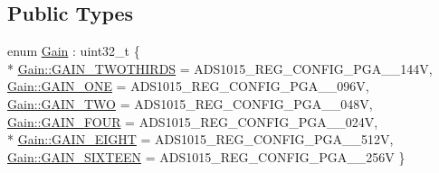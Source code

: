 \subsection*{Public Types}
\begin{DoxyCompactItemize}
\item 
enum \hyperlink{class_loom___a_d_s1115_a3a8b67f3b5757a84d8066cd9c8ea952a}{Gain} \+: uint32\+\_\+t \{ \\*
\hyperlink{class_loom___a_d_s1115_a3a8b67f3b5757a84d8066cd9c8ea952aa4f368390110c2278aa3c72e6b085354c}{Gain\+::\+G\+A\+I\+N\+\_\+\+T\+W\+O\+T\+H\+I\+R\+DS} = A\+D\+S1015\+\_\+\+R\+E\+G\+\_\+\+C\+O\+N\+F\+I\+G\+\_\+\+P\+G\+A\+\_\+\_\+144V, 
\hyperlink{class_loom___a_d_s1115_a3a8b67f3b5757a84d8066cd9c8ea952aab8284f310841b1a41957a911283bda89}{Gain\+::\+G\+A\+I\+N\+\_\+\+O\+NE} = A\+D\+S1015\+\_\+\+R\+E\+G\+\_\+\+C\+O\+N\+F\+I\+G\+\_\+\+P\+G\+A\+\_\+\_\+096V, 
\hyperlink{class_loom___a_d_s1115_a3a8b67f3b5757a84d8066cd9c8ea952aa8d6f24e65fcc2887089a99a84b99dc77}{Gain\+::\+G\+A\+I\+N\+\_\+\+T\+WO} = A\+D\+S1015\+\_\+\+R\+E\+G\+\_\+\+C\+O\+N\+F\+I\+G\+\_\+\+P\+G\+A\+\_\+\_\+048V, 
\hyperlink{class_loom___a_d_s1115_a3a8b67f3b5757a84d8066cd9c8ea952aa6076fa4cd6ea21a2b7594e4a55f49a10}{Gain\+::\+G\+A\+I\+N\+\_\+\+F\+O\+UR} = A\+D\+S1015\+\_\+\+R\+E\+G\+\_\+\+C\+O\+N\+F\+I\+G\+\_\+\+P\+G\+A\+\_\+\_\+024V, 
\\*
\hyperlink{class_loom___a_d_s1115_a3a8b67f3b5757a84d8066cd9c8ea952aa807d8cf62c79d677ad96e017fc9c8a89}{Gain\+::\+G\+A\+I\+N\+\_\+\+E\+I\+G\+HT} = A\+D\+S1015\+\_\+\+R\+E\+G\+\_\+\+C\+O\+N\+F\+I\+G\+\_\+\+P\+G\+A\+\_\+\_\+512V, 
\hyperlink{class_loom___a_d_s1115_a3a8b67f3b5757a84d8066cd9c8ea952aab130f619fbd0feb9cd3b045068446e2f}{Gain\+::\+G\+A\+I\+N\+\_\+\+S\+I\+X\+T\+E\+EN} = A\+D\+S1015\+\_\+\+R\+E\+G\+\_\+\+C\+O\+N\+F\+I\+G\+\_\+\+P\+G\+A\+\_\+\_\+256V
 \}
\end{DoxyCompactItemize}

